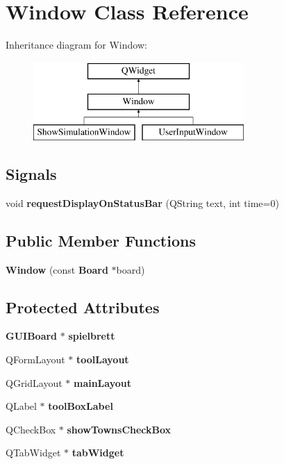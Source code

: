 \section{Window Class Reference}
\label{class_window}
Inheritance diagram for Window\-:\begin{figure}[H]
\begin{center}
\leavevmode
\includegraphics[height=3.000000cm]{class_window}
\end{center}
\end{figure}
\subsection*{Signals}
\begin{DoxyCompactItemize}
\item 
void {\bfseries request\-Display\-On\-Status\-Bar} (Q\-String text, int time=0)\label{class_window_ab6b062b8af87f2ec993bf633fc4f2d46}

\end{DoxyCompactItemize}
\subsection*{Public Member Functions}
\begin{DoxyCompactItemize}
\item 
{\bf Window} (const {\bf Board} $\ast$board)
\end{DoxyCompactItemize}
\subsection*{Protected Attributes}
\begin{DoxyCompactItemize}
\item 
{\bf G\-U\-I\-Board} $\ast$ {\bfseries spielbrett}\label{class_window_afc83752db1657acb7c47a135b5cc481c}

\item 
Q\-Form\-Layout $\ast$ {\bfseries tool\-Layout}\label{class_window_a7864a9891249e0e918d6ee5741a95a96}

\item 
Q\-Grid\-Layout $\ast$ {\bfseries main\-Layout}\label{class_window_ab4750bf3acf837e41ee9e4e6a9fa9856}

\item 
Q\-Label $\ast$ {\bf tool\-Box\-Label}
\item 
Q\-Check\-Box $\ast$ {\bfseries show\-Towns\-Check\-Box}\label{class_window_a8412b9181c563862e596c3dd6c7d9cbf}

\item 
Q\-Tab\-Widget $\ast$ {\bfseries tab\-Widget}\label{class_window_ab5631a2fe8d9f7c62e344270543cff20}

\end{DoxyCompactItemize}


